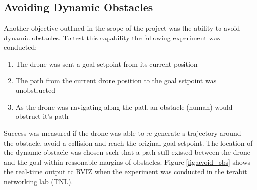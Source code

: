 \documentclass[capstone_report.tex]{subfiles}
\begin{document}
\subsection{Avoiding Dynamic Obstacles}
Another objective outlined in the scope of the project was the ability to avoid dynamic obstacles.  To test this capability the following experiment was conducted:
\begin{enumerate}
    \item The drone was sent a goal setpoint from its current position
    \item The path from the current drone position to the goal setpoint was unobstructed
    \item As the drone was navigating along the path an obstacle (human) would obstruct it's path
\end{enumerate}
Success was measured if the drone was able to re-generate a trajectory around the obstacle, avoid a collision and reach the original goal setpoint.  The location of the dynamic obstacle was chosen such that a path still existed between the drone and the goal within reasonable margins of obstacles.  Figure \ref{fig:avoid_obs} shows the real-time output to RVIZ when the experiment was conducted in the terabit networking lab (TNL).
\end{document}
